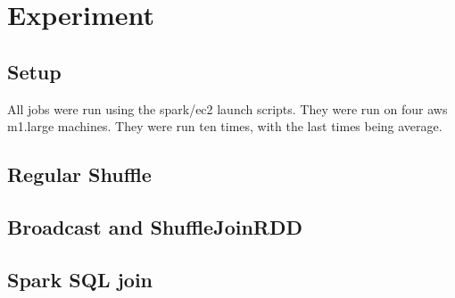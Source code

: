 \chapter{Experiment}

\section{Setup}
All jobs were run using the spark/ec2 launch scripts. They were run on 
four aws m1.large machines. They were run ten times, with the last times 
being average.

\section{Regular Shuffle}


\section{Broadcast and ShuffleJoinRDD}

\section{Spark SQL join}
